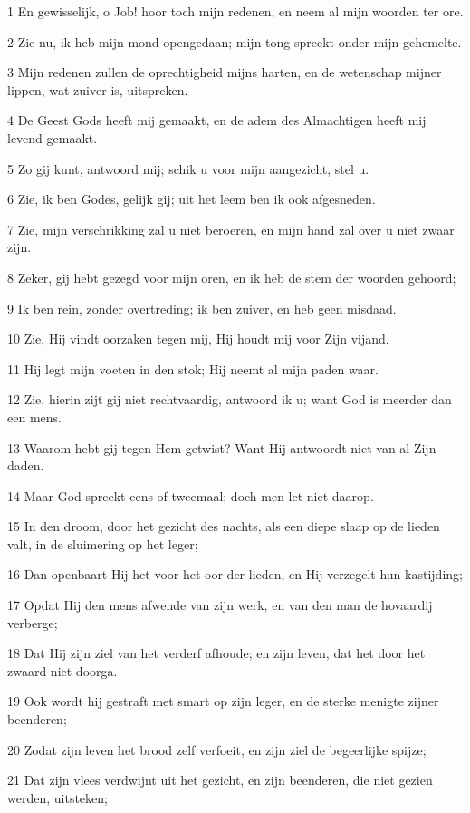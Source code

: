 \par 1 En gewisselijk, o Job! hoor toch mijn redenen, en neem al mijn woorden ter ore.
\par 2 Zie nu, ik heb mijn mond opengedaan; mijn tong spreekt onder mijn gehemelte.
\par 3 Mijn redenen zullen de oprechtigheid mijns harten, en de wetenschap mijner lippen, wat zuiver is, uitspreken.
\par 4 De Geest Gods heeft mij gemaakt, en de adem des Almachtigen heeft mij levend gemaakt.
\par 5 Zo gij kunt, antwoord mij; schik u voor mijn aangezicht, stel u.
\par 6 Zie, ik ben Godes, gelijk gij; uit het leem ben ik ook afgesneden.
\par 7 Zie, mijn verschrikking zal u niet beroeren, en mijn hand zal over u niet zwaar zijn.
\par 8 Zeker, gij hebt gezegd voor mijn oren, en ik heb de stem der woorden gehoord;
\par 9 Ik ben rein, zonder overtreding; ik ben zuiver, en heb geen misdaad.
\par 10 Zie, Hij vindt oorzaken tegen mij, Hij houdt mij voor Zijn vijand.
\par 11 Hij legt mijn voeten in den stok; Hij neemt al mijn paden waar.
\par 12 Zie, hierin zijt gij niet rechtvaardig, antwoord ik u; want God is meerder dan een mens.
\par 13 Waarom hebt gij tegen Hem getwist? Want Hij antwoordt niet van al Zijn daden.
\par 14 Maar God spreekt eens of tweemaal; doch men let niet daarop.
\par 15 In den droom, door het gezicht des nachts, als een diepe slaap op de lieden valt, in de sluimering op het leger;
\par 16 Dan openbaart Hij het voor het oor der lieden, en Hij verzegelt hun kastijding;
\par 17 Opdat Hij den mens afwende van zijn werk, en van den man de hovaardij verberge;
\par 18 Dat Hij zijn ziel van het verderf afhoude; en zijn leven, dat het door het zwaard niet doorga.
\par 19 Ook wordt hij gestraft met smart op zijn leger, en de sterke menigte zijner beenderen;
\par 20 Zodat zijn leven het brood zelf verfoeit, en zijn ziel de begeerlijke spijze;
\par 21 Dat zijn vlees verdwijnt uit het gezicht, en zijn beenderen, die niet gezien werden, uitsteken;
